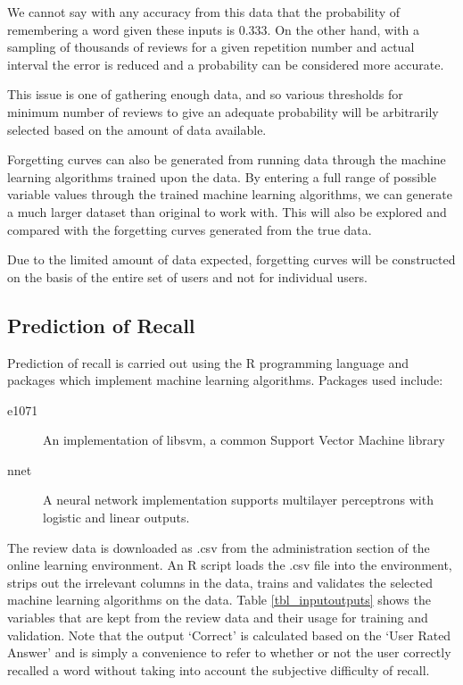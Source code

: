 We cannot say with any accuracy from this data that the probability of remembering a word
given these inputs is 0.333. On the other hand, with a sampling of thousands of reviews for a
given repetition number and actual interval the error is reduced and a probability can
be considered more accurate. %

This issue is one of gathering enough data, and so various thresholds for minimum number of reviews
to give an adequate probability will be arbitrarily selected based on the amount of data available.

Forgetting curves can also be generated from running data through the machine learning
algorithms trained upon the data. By entering a full range of possible variable values through
the trained machine learning algorithms, we can generate a much larger dataset than original
to work with. This will also be explored and compared with the forgetting curves generated from
the true data.

Due to the limited amount of data expected, forgetting curves will be constructed on the basis of
the entire set of users and not for individual users.

\subsection{Prediction of Recall}

Prediction of recall is carried out using the R programming language and packages
which implement machine learning algorithms. Packages used include:
\begin{description}
\item[e1071] An implementation of libsvm, a common Support Vector Machine library
\item[nnet] A neural network implementation supports multilayer perceptrons with 
logistic and linear outputs.
\end{description}

The review data is downloaded as .csv from the administration section of the online
learning environment. An R script loads the .csv file into the environment, strips
out the irrelevant columns in the data, trains and validates the selected 
machine learning algorithms on the data. Table \ref{tbl_inputoutputs} shows
the variables that are kept from the review data and their usage for training
and validation. Note that the output `Correct' is calculated based on the `User
Rated Answer' and is simply a convenience to refer to whether or
not the user correctly recalled a word without taking into account the subjective
difficulty of recall.

